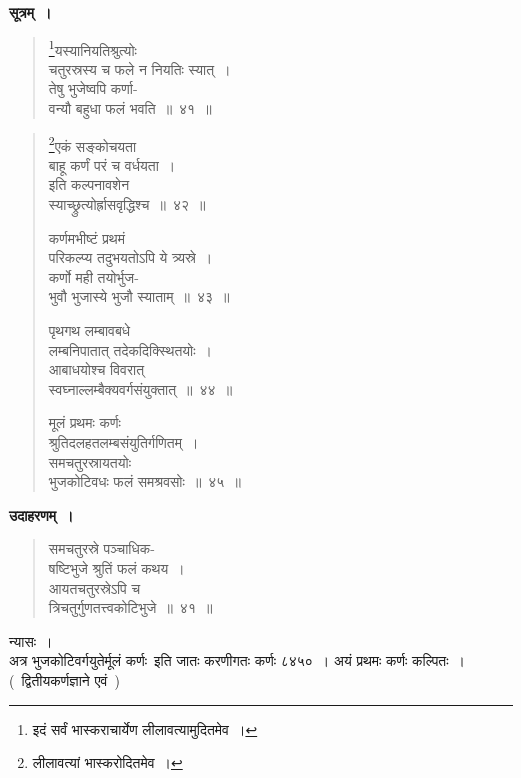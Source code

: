 \documentclass[11pt, openany]{book}
\makeatletter
\newcommand{\devanagarinumeral}[1]{%
	\devanagaridigits{\number\csname c@#1\endcsname}}
\makeatother
\begin{document}
 \textbf{सूत्रम्~।}
 \renewcommand{\thefootnote}{\devanagarinumeral{footnote}}
 \setcounter{footnote}{0}
\begin{quote}
\bs 
     \footnote{इदं सर्वं भास्कराचार्येण लीलावत्यामुदितमेव~।}यस्यानियतिश्रुत्योः\\
     चतुरस्रस्य च फले न नियतिः स्यात्~।\\
तेषु भुजेष्वपि कर्णा-\\
वन्यौ बहुधा फलं भवति~॥~४१~॥
\end{quote}
\newpage
\setcounter{footnote}{0}
\begin{quote}
    \bs 
 \footnote{लीलावत्यां भास्करोदितमेव~।}एकं सङ्कोचयता \\
 बाहू कर्णं परं च वर्धयता~।\\
इति कल्पनावशेन \\
स्याच्छ्रुत्योर्ह्रासवृद्धिश्च~॥~४२~॥
\vspace{1mm}

कर्णमभीष्टं प्रथमं \\
परिकल्प्य तदुभयतोऽपि ये त्र्यस्रे~।\\
कर्णो मही तयोर्भुज-\\
भुवौ भुजास्ये भुजौ स्याताम्~॥~४३~॥
\vspace{1mm}

पृथगथ लम्बावबधे \\
लम्बनिपातात् तदेकदिक्स्थितयोः~।\\
आबाधयोश्च विवरात् \\
स्वघ्नाल्लम्बैक्यवर्गसंयुक्तात्~॥~४४~॥ 
\vspace{1mm}

 \label{4.45}
मूलं प्रथमः कर्णः \\
श्रुतिदलहतलम्बसंयुतिर्गणितम्~।\\
समचतुरस्रायतयोः\\
भुजकोटिवधः फलं समश्रवसोः~॥~४५~॥
\end{quote}
\newpage%
 \textbf{उदाहरणम्~।} 
\begin{quote}
    \bqt 
    समचतुरस्रे पञ्चाधिक-\\
    षष्टिभुजे श्रुतिं फलं कथय~।\\
आयतचतुरस्रेऽपि च \\
त्रिचतुर्गुणतत्त्वकोटिभुजे~॥~४१~॥
\end{quote}

 न्यासः~। \\

\vspace{-4mm}
 अत्र भुजकोटिवर्गयुतेर्मूलं कर्णः\textendash\ इति जातः करणीगतः कर्णः
८४५०~। अयं प्रथमः कर्णः कल्पितः~। (\ द्वितीयकर्णज्ञाने एवं\ )
\vspace{-2mm}
\end{document}
